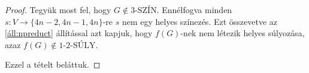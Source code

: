 \documentclass[12pt, a4paper]{report}
\theoremstyle{remark}
\theoremstyle{definition}
\begin{document}
\begin{proof}
Tegyük most fel, hogy $G \notin \textrm{3-SZÍN}$. Ennélfogva minden $s: V \rightarrow \lbrace 4n - 2, 4n - 1, 4n \rbrace$-re $s$ nem egy helyes színezés. Ezt összevetve az \ref{áll:npreduct} állítással azt kapjuk, hogy $f(G)$-nek nem létezik helyes súlyozása, azaz $f(G) \notin \textrm{1-2-SÚLY}$.

Ezzel a tételt beláttuk.
\end{proof}

\printbibliography
\end{document}
